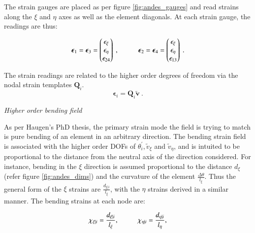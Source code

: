The strain gauges are placed as per figure \ref{fig:andes_gauges} and read strains along the $\xi$ and $\eta$ axes as well as the element diagonals. At each strain gauge, the readings are thus:

\begin{equation} 
\boldsymbol{\epsilon}_{1} = \boldsymbol{\epsilon}_{3} =
\begin{pmatrix}
\epsilon_\xi \\
\epsilon_\eta \\
\epsilon_{24}
\end{pmatrix}
\ ,
\hspace{10mm}
\boldsymbol{\epsilon}_{2} = \boldsymbol{\epsilon}_{4} =
\begin{pmatrix}
\epsilon_\xi \\
\epsilon_\eta \\
\epsilon_{13}
\end{pmatrix}
\label{eqnAndesStrainGauges}\ .
\end{equation}

The strain readings are related to the higher order degrees of freedom via the nodal strain templates $\mathbf{Q}_i$.
\begin{equation} 
\boldsymbol{\epsilon}_{i} = \mathbf{Q}_i \widetilde{\mathbf{v}}
\label{eqnAndesHigherOrderStrains}\ .
\end{equation}

\textit{Higher order bending field}

As per Haugen's PhD thesis, the primary strain mode the field is trying to match is pure bending of an element in an arbitrary direction. The bending strain field is associated with the higher order DOFs of $\theta_i^{'}, \widetilde{v}_{\xi}$ and $\widetilde{v}_{\eta}$, and is intuited to be proportional to the distance from the neutral axis of the direction considered. For instance, bending in the $\xi$ direction is assumed proportional to the distance $d_{\xi}$ (refer figure \ref{fig:andes_dims}) and the curvature of the element $\frac{\Delta \theta}{l_{\xi}}$. Thus the general form of the $\xi$ strains are $\frac{d_{\xi | i}}{l_\xi}$, with the $\eta$ strains derived in a similar manner. The bending strains at each node are:

\begin{equation} 
\chi_{\xi | i} = \frac{d_{\xi | i}}{l_\xi},
\hspace{10mm}
\chi_{\eta | i} = \frac{d_{\eta | i}}{l_\eta},
\label{equation12}
\end{equation}

